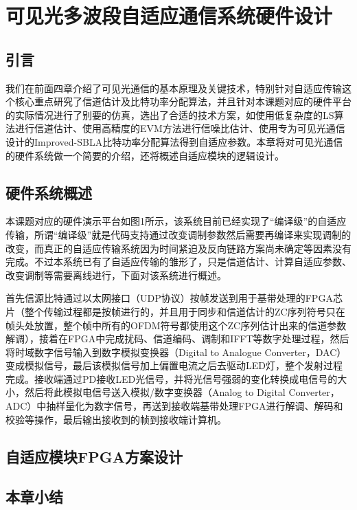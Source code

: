 \chapter{可见光多波段自适应通信系统硬件设计}
\section{引言}
我们在前面四章介绍了可见光通信的基本原理及关键技术，特别针对自适应传输这个核心重点研究了信道估计及比特功率分配算法，并且针对本课题对应的硬件平台的实际情况进行了别要的仿真，选出了合适的技术方案，如使用低复杂度的LS算法进行信道估计、使用高精度的EVM方法进行信噪比估计、使用专为可见光通信设计的Improved-SBLA比特功率分配算法得到自适应参数。本章将对可见光通信的硬件系统做一个简要的介绍，还将概述自适应模块的逻辑设计。
\section{硬件系统概述}
本课题对应的硬件演示平台如图1所示，该系统目前已经实现了“编译级”的自适应传输，所谓“编译级”就是代码支持通过改变调制参数然后需要再编译来实现调制的改变，而真正的自适应传输系统因为时间紧迫及反向链路方案尚未确定等因素没有完成。不过本系统已有了自适应传输的雏形了，只是信道估计、计算自适应参数、改变调制等需要离线进行，下面对该系统进行概述。

首先信源比特通过以太网接口（UDP协议）按帧发送到用于基带处理的FPGA芯片（整个传输过程都是按帧进行的，并且用于同步和信道估计的ZC序列符号只在帧头处放置，整个帧中所有的OFDM符号都使用这个ZC序列估计出来的信道参数解调），接着在FPGA中完成扰码、信道编码、调制和IFFT等数字处理过程，然后将时域数字信号输入到数字模拟变换器（Digital to Analogue Converter，DAC）变成模拟信号，最后该模拟信号加上偏置电流之后去驱动LED灯，整个发射过程完成。接收端通过PD接收LED光信号，并将光信号强弱的变化转换成电信号的大小，然后将此模拟电信号送入模拟/数字变换器（Analog to Digital Converter，ADC）中抽样量化为数字信号，再送到接收端基带处理FPGA进行解调、解码和校验等操作，最后输出接收到的帧到接收端计算机。
\section{自适应模块FPGA方案设计}
\section{本章小结}